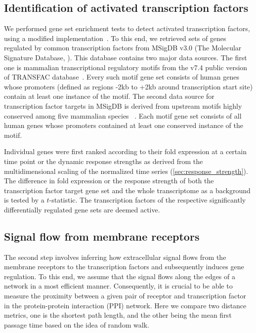 \subsection{Identification of activated transcription factors}
We performed gene set enrichment tests to detect activated
transcription factors, 
using a modified implementation~\citep{Luo2009}.
To this end, we retrieved sets of genes regulated by 
common transcription factors from MSigDB v3.0 (The Molecular Signature Database, \cite{Liberzon2011}). 
This database contains two major data sources. The first one is mammalian 
transcriptional regulatory motifs from the v7.4 public version of TRANSFAC 
database~\citep{Matys2003b}. Every such motif gene set consists of human 
genes whose promoters (defined as regions -2kb to +2kb around transcription 
start site) contain at least one instance of the motif.
The second data source for transcription factor targets in MSigDB is derived 
from upstream motifs highly conserved among five mammalian species~%
\citep{Xie2005e}. Each motif gene set consists of all human genes whose 
promoters contained at least one conserved instance of the motif.

Individual genes were first ranked according to their fold 
expression at a certain time point or the dynamic response 
strengths as derived from the 
multidimensional scaling of the normalized time series 
(\ref{sec:response_strength}). The difference in fold 
expression or the response strength of both
the transcription factor target gene set and  
the whole transcriptome as a background is tested by a 
$t$-statistic. 
The transcription factors of the respective significantly differentially regulated
gene sets are deemed active.

\subsection{Signal flow from membrane receptors}
The second step involves inferring how extracellular signal flows from the 
membrane receptors to 
the transcription factors and subsequently induces gene regulation. 
To this end, we assume that the signal flows along the edges of a network 
in a most efficient manner. Consequently, it is 
crucial to be able to measure the proximity between a given pair of receptor and
transcription factor in the protein-protein interaction (PPI) 
network. Here we 
compare two distance metrics, one is the shortest path length, and the other
being the mean first passage time based on the idea of random walk.

